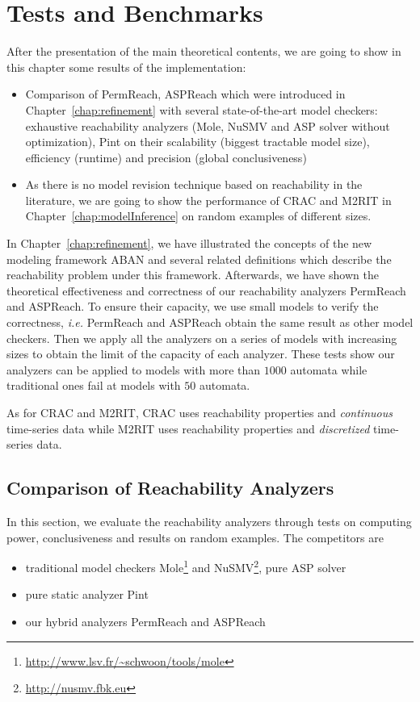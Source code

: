 \chapter{Tests and Benchmarks}\label{chap:test}
\begin{mybox}
After the presentation of the main theoretical contents, we are going to show in this chapter some results of the implementation:

\begin{itemize}
    \item Comparison of PermReach, ASPReach which were introduced in Chapter~\ref{chap:refinement} with several state-of-the-art model checkers: exhaustive reachability analyzers (Mole, NuSMV and ASP solver without optimization), Pint on their scalability (biggest tractable model size), efficiency (runtime) and precision (global conclusiveness)
    \item As there is no model revision technique based on reachability in the literature, we are going to show the performance of CRAC and M2RIT in Chapter~\ref{chap:modelInference} on random examples of different sizes.
\end{itemize}
\end{mybox}

In Chapter~\ref{chap:refinement}, we have illustrated the concepts of the new modeling framework ABAN and several related definitions which describe the reachability problem under this framework.
Afterwards, we have shown the theoretical effectiveness and correctness of our reachability analyzers PermReach and ASPReach. 
To ensure their capacity, we use small models to verify the correctness, \textit{i.e.} PermReach and ASPReach obtain the same result as other model checkers.
Then we apply all the analyzers on a series of models with increasing sizes to obtain the limit of the capacity of each analyzer.
These tests show our analyzers can be applied to models with more than $1000$ automata while traditional ones fail at models with $50$ automata.

As for CRAC and M2RIT, CRAC uses reachability properties and \textit{continuous} time-series data while M2RIT uses reachability properties and \textit{discretized} time-series data.


\section{Comparison of Reachability Analyzers}\label{sec:compReachAnalyzers}
In this section, we evaluate the reachability analyzers through tests on computing power, conclusiveness and results on random examples.
The competitors are
\begin{itemize}
    \item traditional model checkers Mole\footnote{\url{http://www.lsv.fr/~schwoon/tools/mole}} and NuSMV\footnote{\url{http://nusmv.fbk.eu}}, pure ASP solver~\cite{abdallah2015exhaustive}
    \item pure static analyzer Pint~\cite{pauleve2017reduction}
    \item our hybrid analyzers PermReach and ASPReach
\end{itemize}

